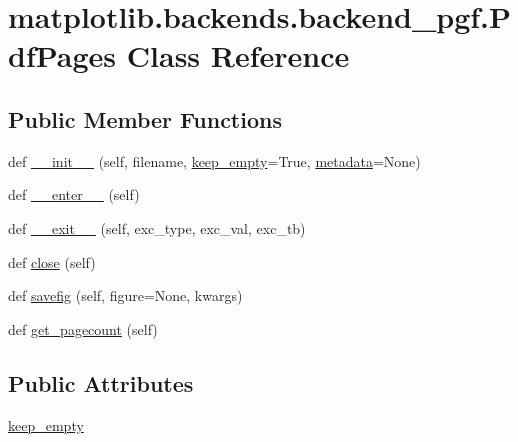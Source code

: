 \hypertarget{classmatplotlib_1_1backends_1_1backend__pgf_1_1PdfPages}{}\section{matplotlib.\+backends.\+backend\+\_\+pgf.\+Pdf\+Pages Class Reference}
\label{classmatplotlib_1_1backends_1_1backend__pgf_1_1PdfPages}
\subsection*{Public Member Functions}
\begin{DoxyCompactItemize}
\item 
def \hyperlink{classmatplotlib_1_1backends_1_1backend__pgf_1_1PdfPages_a75f33cc81e3f6e3522f7b6be9a6e3daa}{\+\_\+\+\_\+init\+\_\+\+\_\+} (self, filename, \hyperlink{classmatplotlib_1_1backends_1_1backend__pgf_1_1PdfPages_a75ae9bf1292bb1d603d8debf3f390ad6}{keep\+\_\+empty}=True, \hyperlink{classmatplotlib_1_1backends_1_1backend__pgf_1_1PdfPages_abc6bfec62cb55e092bf709e7b0cf6dfb}{metadata}=None)
\item 
def \hyperlink{classmatplotlib_1_1backends_1_1backend__pgf_1_1PdfPages_afaa1b617ee1e2ce0d481f497cc8a9bd1}{\+\_\+\+\_\+enter\+\_\+\+\_\+} (self)
\item 
def \hyperlink{classmatplotlib_1_1backends_1_1backend__pgf_1_1PdfPages_ab61d345368ec191a77d835c529bb0620}{\+\_\+\+\_\+exit\+\_\+\+\_\+} (self, exc\+\_\+type, exc\+\_\+val, exc\+\_\+tb)
\item 
def \hyperlink{classmatplotlib_1_1backends_1_1backend__pgf_1_1PdfPages_a2238c3d07b9aa9bd7d2f6b8c2624a0db}{close} (self)
\item 
def \hyperlink{classmatplotlib_1_1backends_1_1backend__pgf_1_1PdfPages_aa4381cce96ba1f47fa23fe757cb3cd21}{savefig} (self, figure=None, kwargs)
\item 
def \hyperlink{classmatplotlib_1_1backends_1_1backend__pgf_1_1PdfPages_a4894409455ce0df712c96837efde3cc2}{get\+\_\+pagecount} (self)
\end{DoxyCompactItemize}
\subsection*{Public Attributes}
\begin{DoxyCompactItemize}
\item 
\hyperlink{classmatplotlib_1_1backends_1_1backend__pgf_1_1PdfPages_a75ae9bf1292bb1d603d8debf3f390ad6}{keep\+\_\+empty}
\end{DoxyCompactItemize}

